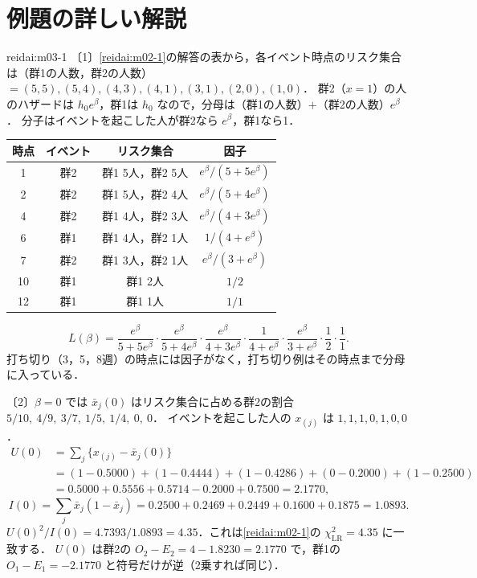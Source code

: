\section{例題の詳しい解説}\label{sec:m03-kaisetsu}
\begin{kaitou}{reidai:m03-1}
〔1〕\cref{reidai:m02-1}の解答の表から，各イベント時点のリスク集合は（群1の人数，群2の人数）$=(5,5),(5,4),(4,3),(4,1),(3,1),(2,0),(1,0)$．
群2（$x=1$）の人のハザードは $h_0e^\beta$，群1は $h_0$ なので，分母は（群1の人数）$+$（群2の人数）$e^\beta$．
分子はイベントを起こした人が群2なら $e^\beta$，群1なら1．
\begin{center}\small
\begin{tabular}{@{}cccc@{}}
\toprule
時点 & イベント & リスク集合 & 因子\\
\midrule
1 & 群2 & 群1 5人，群2 5人 & $e^\beta/(5+5e^\beta)$\\
2 & 群2 & 群1 5人，群2 4人 & $e^\beta/(5+4e^\beta)$\\
4 & 群2 & 群1 4人，群2 3人 & $e^\beta/(4+3e^\beta)$\\
6 & 群1 & 群1 4人，群2 1人 & $1/(4+e^\beta)$\\
7 & 群2 & 群1 3人，群2 1人 & $e^\beta/(3+e^\beta)$\\
10 & 群1 & 群1 2人 & $1/2$\\
12 & 群1 & 群1 1人 & $1/1$\\
\bottomrule
\end{tabular}
\end{center}
\[
L(\beta)=\frac{e^\beta}{5+5e^\beta}\cdot\frac{e^\beta}{5+4e^\beta}\cdot\frac{e^\beta}{4+3e^\beta}\cdot\frac{1}{4+e^\beta}\cdot\frac{e^\beta}{3+e^\beta}\cdot\frac12\cdot\frac11 .
\]
打ち切り（3，5，8週）の時点には因子がなく，打ち切り例はその時点まで分母に入っている．

〔2〕$\beta=0$ では $\bar x_j(0)$ はリスク集合に占める群2の割合 $5/10,\ 4/9,\ 3/7,\ 1/5,\ 1/4,\ 0,\ 0$．
イベントを起こした人の $x_{(j)}$ は $1,1,1,0,1,0,0$．
\begin{align*}
U(0)&=\sum_j\{x_{(j)}-\bar x_j(0)\}\\
&=(1-0.5000)+(1-0.4444)+(1-0.4286)+(0-0.2000)+(1-0.2500)\\
&=0.5000+0.5556+0.5714-0.2000+0.7500=2.1770,
\end{align*}
\[
I(0)=\sum_j\bar x_j(1-\bar x_j)=0.2500+0.2469+0.2449+0.1600+0.1875=1.0893 .
\]
$U(0)^2/I(0)=4.7393/1.0893=4.35$．これは\cref{reidai:m02-1}の $\chi^2_{\mathrm{LR}}=4.35$ に一致する．
$U(0)$ は群2の $O_2-E_2=4-1.8230=2.1770$ で，群1の $O_1-E_1=-2.1770$ と符号だけが逆（2乗すれば同じ）．
\end{kaitou}


